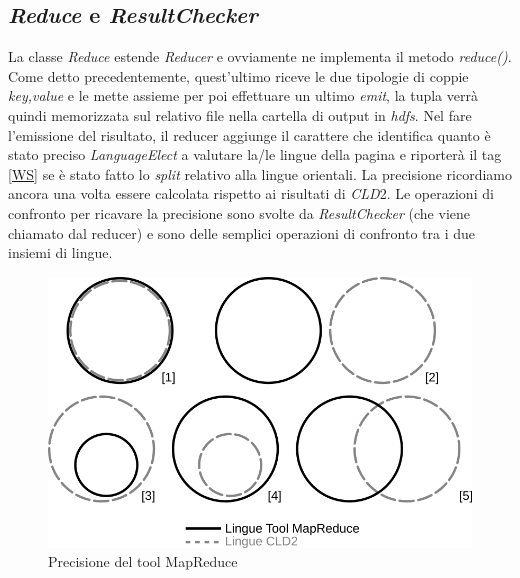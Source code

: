 \documentclass{article}
\newcommand{\MR}{MapReduce}
\newcommand{\cld}{\textit{CLD}2}
\newcommand{\class}[1]{\textit{#1}}
\newcommand{\function}[1]{\textit{#1}}
\newcommand{\mintedstyle}[1]{\url{#1}}
\begin{document}
\subsection{\class{Reduce} e \class{ResultChecker}}
La classe \class{Reduce} estende \class{Reducer} e ovviamente ne implementa il metodo \function{reduce()}. Come detto precedentemente, quest'ultimo riceve le due tipologie di coppie \textit{\textlangle key,value\textrangle} e le mette assieme per poi effettuare un ultimo \textit{emit}, la tupla verrà quindi memorizzata sul relativo file nella cartella di output in \textit{hdfs}. Nel fare l'emissione del risultato, il reducer aggiunge il carattere che identifica quanto è stato preciso \class{LanguageElect} a valutare la/le lingue della pagina e riporterà il tag \mintedstyle{[WS]} se è stato fatto lo \textit{split} relativo alla lingue orientali. La precisione ricordiamo ancora una volta essere calcolata rispetto ai risultati di \cld{}. Le operazioni di confronto per ricavare la precisione sono svolte da \class{ResultChecker} (che viene chiamato dal reducer) e sono delle semplici operazioni di confronto tra i due insiemi di lingue.

\begin{figure}[h]
    \centering
    \includegraphics[scale=0.6]{images/sets.png}
    \caption{Precisione del tool \MR{}}
    \label{fig:sets}
\end{figure}
\end{document}
